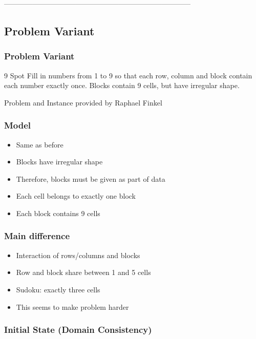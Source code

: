 
------------------------------------------------------------------------------

\subsection{Problem Variant}
\begin{frame}
\frametitle{Problem Variant}
\begin{block}{9 Spot }
Fill in numbers from 1 to 9 so that each row, column and block contain each number exactly once. Blocks contain 9 cells, but have irregular shape.
\end{block}
Problem and Instance provided by Raphael Finkel
\end{frame}

\begin{frame}
\frametitle{Model}
\begin{itemize}
\item Same as before
\item Blocks have irregular shape
\item Therefore, blocks must be given as part of data
\item Each cell belongs to exactly one block
\item Each block contains 9 cells
\end{itemize}
\end{frame}

\begin{frame}
\frametitle{Main difference}
\begin{itemize}
\item Interaction of rows/columns and blocks
\item Row and block share between 1 and 5 cells
\item Sudoku: exactly three cells
\item This seems to make problem harder
\end{itemize}
\end{frame}

\begin{frame}
\frametitle{Initial State (Domain Consistency)}

\end{frame}

